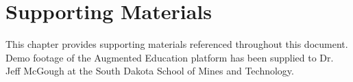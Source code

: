 \chapter{Supporting Materials}
\label{ch:support}

This chapter provides supporting materials referenced throughout this document. Demo footage of the Augmented Education platform has been supplied to Dr. Jeff McGough at the South Dakota School of Mines and Technology.


\label{F:F-1}

\label{F:F-1}







 

